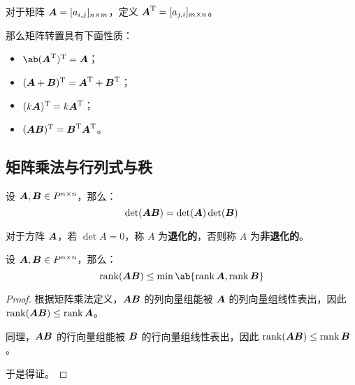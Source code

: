 \begin{definition}[矩阵的转置]
	对于矩阵 $\boldsymbol{A} = [a_{i,j}]_{n \times m}$，定义 $\boldsymbol{A}^\mathrm{T} = [a_{j,i}]_{m \times n}$。
\end{definition}

那么矩阵转置具有下面性质：

\begin{property}[矩阵转置的性质]
	\begin{itemize}
		\item $\ab(\matr{A}^\mathrm{T})^\mathrm{T} = \matr{A}$；
		\item $(\boldsymbol{A} + \boldsymbol{B})^\mathrm{T} = \boldsymbol{A}^\mathrm{T} + \boldsymbol{B}^\mathrm{T}$；
		\item $(k \boldsymbol{A})^\mathrm{T} = k \boldsymbol{A}^\mathrm{T}$；
		\item $(\boldsymbol{A} \boldsymbol{B})^\mathrm{T} = \boldsymbol{B}^\mathrm{T} \boldsymbol{A}^\mathrm{T}$。
	\end{itemize}
\end{property}

\subsection{矩阵乘法与行列式与秩}

\begin{theorem}
	设 $\boldsymbol{A},\boldsymbol{B} \in P^{n \times n}$，那么：
	$$
	\det(\boldsymbol{A} \boldsymbol{B}) = \det(\boldsymbol{A}) \det(\boldsymbol{B})
	$$
\end{theorem}

\begin{definition}
	对于方阵 $\boldsymbol{A}$，若 $\det A = 0$，称 $A$ 为\textbf{退化的}，否则称 $A$ 为\textbf{非退化的}。
\end{definition}

\begin{theorem}
	设 $\boldsymbol{A},\boldsymbol{B} \in P^{n \times n}$，那么：
	$$
	\rank(\matr{A} \matr{B}) \le \min\ab\{\rank \matr{A}, \rank \matr{B}\}
	$$

	\begin{proof}
		根据矩阵乘法定义，$\boldsymbol{A} \boldsymbol{B}$ 的列向量组能被 $\boldsymbol{A}$ 的列向量组线性表出，因此 $\operatorname{rank}(\boldsymbol{A} \boldsymbol{B}) \le \operatorname{rank} \boldsymbol{A}$。

		同理，$\boldsymbol{A} \boldsymbol{B}$ 的行向量组能被 $\boldsymbol{B}$ 的行向量组线性表出，因此 $\operatorname{rank}(\boldsymbol{A} \boldsymbol{B}) \le \operatorname{rank} \boldsymbol{B}$。

		于是得证。
	\end{proof}
\end{theorem}

